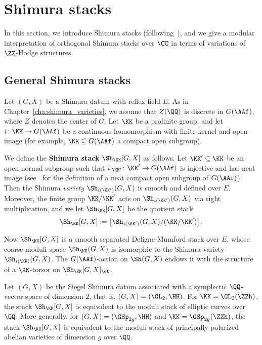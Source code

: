 \section{Shimura stacks}\label{sec:shimura_stacks}
In this section, we introduce Shimura stacks (following~\cite{TaelmanShimuraStacks}), and we give a modular interpretation of orthogonal Shimura stacks over $\CC$ in terms of variations of $\ZZ$-Hodge structures.

\subsection{General Shimura stacks}\label{sec:general_shimura_vhs}
Let $(G,X)$ be a Shimura datum with reflex field $E$. As in Chapter~\ref{cha:shimura_varieties}, we assume that $Z(\QQ)$ is discrete in $G(\AAf)$, where $Z$ denotes the center of $G$. Let $\KK$ be a profinite group, and let $i\colon \KK \rightarrow G(\AAf)$ be a continuous homomorphism with finite kernel and open image (for example, $\KK \subseteq G(\AAf)$ a compact open subgroup).

We define the {\bfseries Shimura stack} $\Sh_{\KK}[G,X]$ as follows. Let $\KK' \subseteq \KK$ be an open normal subgroup such that $i|_{\KK'}\colon \KK' \rightarrow G(\AAf)$ is injective and has neat image (see~\cite{MilneShimura} for the definition of a neat compact open subgroup of $G(\AAf)$). Then the Shimura \emph{variety} $\Sh_{i(\KK')}(G,X)$ is smooth and defined over $E$. Moreover, the finite group $\KK/\KK'$ acts on $\Sh_{i(\KK')}(G,X)$ via right multiplication, and we let $\Sh_{\KK}[G,X]$ be the quotient stack
$$
\Sh_{\KK}[G,X] := \left[ \Sh_{i(\KK')}(G,X)/(\KK/\KK') \right].
$$

Now $\Sh_{\KK}[G,X]$ is a smooth separated Deligne-Mumford stack over $E$, whose coarse moduli space $\Sh_{\KK}(G,X)$ is isomorphic to the Shimura variety $\Sh_{i(\KK)}(G,X)$. The $G(\AAf)$-action on $\Sh(G,X)$ endows it with the structure of a $\KK$-torsor on $\Sh_{\KK}[G,X]_{\et}$.

\begin{example}
    Let $(G,X)$ be the Siegel Shimura datum associated with a symplectic $\QQ$-vector space of dimension $2$, that is, $(G,X) = (\GL_2,\HH)$. For $\KK = \GL_2(\ZZh)$, the stack $\Sh_{\KK}[G,X]$ is equivalent to the moduli stack of elliptic curves over $\QQ$. More generally, for $(G,X) = (\GSp_{2g},\HH)$ and $\KK = \GSp_{2g}(\ZZh)$, the stack $\Sh_{\KK}[G,X]$ is equivalent to the moduli stack of principally polarized abelian varieties of dimension $g$ over $\QQ$.
\end{example}

